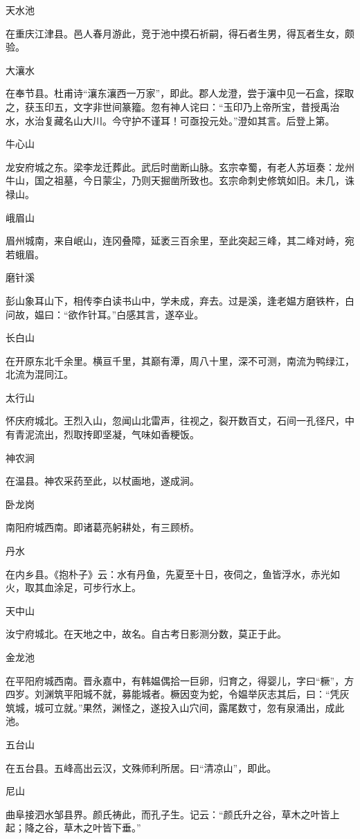 \documentclass[a4paper,12pt,UTF8,twoside]{ctexbook}
\begin{document}
天水池

在重庆江津县。邑人春月游此，竞于池中摸石祈嗣，得石者生男，得瓦者生女，颇验。

大瀼水

在奉节县。杜甫诗“瀼东瀼西一万家”，即此。郡人龙澄，尝于瀼中见一石盒，探取之，获玉印五，文字非世间篆籀。忽有神人诧曰：“玉印乃上帝所宝，昔授禹治水，水治复藏名山大川。今守护不谨耳！可亟投元处。”澄如其言。后登上第。

牛心山

龙安府城之东。梁李龙迁葬此。武后时凿断山脉。玄宗幸蜀，有老人苏垣奏：龙州牛山，国之祖墓，今日蒙尘，乃则天掘凿所致也。玄宗命刺史修筑如旧。未几，诛禄山。

峨眉山

眉州城南，来自岷山，连冈叠障，延袤三百余里，至此突起三峰，其二峰对峙，宛若蛾眉。

磨针溪

彭山象耳山下，相传李白读书山中，学未成，弃去。过是溪，逢老媪方磨铁杵，白问故，媪曰：“欲作针耳。”白感其言，遂卒业。

长白山

在开原东北千余里。横亘千里，其巅有潭，周八十里，深不可测，南流为鸭绿江，北流为混同江。

太行山

怀庆府城北。王烈入山，忽闻山北雷声，往视之，裂开数百丈，石间一孔径尺，中有青泥流出，烈取抟即坚凝，气味如香粳饭。

神农涧

在温县。神农采药至此，以杖画地，遂成涧。

卧龙岗

南阳府城西南。即诸葛亮躬耕处，有三顾桥。

丹水

在内乡县。《抱朴子》云：水有丹鱼，先夏至十日，夜伺之，鱼皆浮水，赤光如火，取其血涂足，可步行水上。

天中山

汝宁府城北。在天地之中，故名。自古考日影测分数，莫正于此。

金龙池

在平阳府城西南。晋永嘉中，有韩媪偶拾一巨卵，归育之，得婴儿，字曰“橛”，方四岁。刘渊筑平阳城不就，募能城者。橛因变为蛇，令媪举灰志其后，曰：“凭灰筑城，城可立就。”果然，渊怪之，遂投入山穴间，露尾数寸，忽有泉涌出，成此池。

五台山

在五台县。五峰高出云汉，文殊师利所居。曰“清凉山”，即此。

尼山

曲阜接泗水邹县界。颜氏祷此，而孔子生。记云：“颜氏升之谷，草木之叶皆上起；降之谷，草木之叶皆下垂。”
\end{document}
